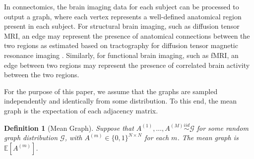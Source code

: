 \documentclass[journal,twoside,web]{ieeecolor}
\newtheorem{definition}[fact]{Definition}
\newcommand{\Ex}{\mathbb{E}}
\begin{document}
In connectomics, the  brain imaging data for each subject can be processed  to output a graph, where each vertex represents a well-defined anatomical region present in each subject.
For structural brain imaging, such as diffusion tensor MRI, an edge may represent the presence of anatomical connections between the two regions as estimated based on tractography for diffusion tensor magnetic resonance imaging \cite{gray2012magnetic}.
Similarly, for functional brain imaging, such as fMRI, an edge between two regions may represent the presence of correlated brain activity between the two regions.



For the purpose of this paper, we assume that the graphs are sampled independently and identically from some distribution.
To this end, the mean graph is the expectation of each adjacency matrix.
\begin{definition}[Mean Graph]
Suppose that $A^{(1)},\dotsc,A^{(M)}\stackrel{iid}{\sim} \mathcal{G}$ for some random graph distribution $\mathcal{G}$, with $A^{(m)}\in\{0,1\}^{N\times N}$ for each $m$.
The {\em mean graph} is $\Ex[A^{(m)}]$.%
\end{definition}
\end{document}
